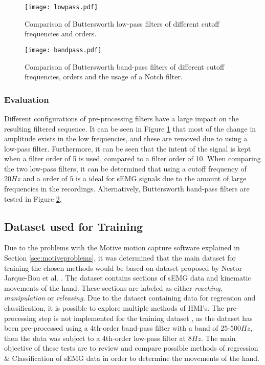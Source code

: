 \documentclass[../main.tex]{subfiles}
\begin{document}
\begin{figure}[H]
\begin{center}
\texttt{[image: lowpass.pdf]}
\caption{Comparison of Buttersworth low-pass filters of different cutoff frequencies and orders.}
\label{fig:lowpass}
\end{center}
\end{figure}
\begin{figure}[H]
\begin{center}
\texttt{[image: bandpass.pdf]}
\caption{Comparison of Buttersworth band-pass filters of different cutoff frequencies, orders and the usage of a Notch filter.}
\label{fig:bandpass}
\end{center}
\end{figure}

\subsubsection{Evaluation}

Different configurations of pre-processing filters have a large impact on the resulting filtered sequence. 
It can be seen in Figure \ref{fig:lowpass} that most of the change in amplitude exists in the low frequencies, and these are removed due to using a low-pass filter.
Furthermore, it can be seen that the intent of the signal is kept when a filter order of 5 is used, compared to a filter order of 10.
When comparing the two low-pass filters, it can be determined that using a cutoff frequency of $20Hz$ and a order of $5$ is a ideal for sEMG signals due to the amount of large frequencies in the recordings.
Alternatively, Buttersworth band-pass filters are tested in Figure \ref{fig:bandpass},

\subsection{Dataset used for Training}

Due to the problems with the Motive motion capture software \cite{motive} explained in Section \ref{sec:motiveproblems}, it was determined that the main dataset for training the chosen methods would be based on dataset \cite{kinmusdataset} proposed by Nestor Jarque-Bou et al. \cite{jarque2019}.
The dataset contains sections of sEMG data and kinematic movements of the hand.
These sections are labeled as either \textit{reaching}, \textit{manipulation} or \textit{releasing}.  
Due to the dataset containing data for regression and classification, it is possible to explore multiple methods of \gls{HMI}'s. 
The pre-processing step is not implemented for the training dataset \cite{kinmusdataset}, as the dataset has been pre-processed using a 4th-order band-pass filter with a band of  $25$-$500Hz$, then the data was subject to a 4th-order low-pass filter at $8 Hz$.
The main objective of these tests are to review and compare possible methods of regression \& Classification of sEMG data in order to determine the movements of the hand.
\end{document}
